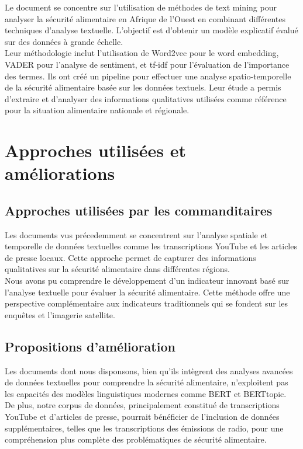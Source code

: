 \documentclass{article}
\begin{document}
Le document se concentre sur l'utilisation de méthodes de text mining pour analyser la sécurité alimentaire en Afrique de l'Ouest en combinant différentes techniques d'analyse textuelle. L'objectif est d'obtenir un modèle explicatif évalué sur des données à grande échelle. \\

Leur méthodologie inclut l'utilisation de Word2vec pour le word embedding, VADER pour l'analyse de sentiment, et tf-idf pour l'évaluation de l'importance des termes. Ils ont créé un pipeline pour effectuer une analyse spatio-temporelle de la sécurité alimentaire basée sur les données textuels. Leur étude a permis d'extraire et d'analyser des informations qualitatives utilisées comme référence pour la situation alimentaire nationale et régionale.

\section{Approches utilisées et améliorations}
\subsection{Approches utilisées par les commanditaires}
Les documents vus précedemment se concentrent sur l'analyse spatiale et temporelle de données textuelles comme les transcriptions YouTube et les articles de presse locaux. Cette approche permet de capturer des informations qualitatives sur la sécurité alimentaire dans différentes régions. \\

Nous avons pu comprendre le développement d'un indicateur innovant basé sur l'analyse textuelle pour évaluer la sécurité alimentaire. Cette méthode offre une perspective complémentaire aux indicateurs traditionnels qui se fondent sur les enquêtes et l'imagerie satellite.

\subsection{Propositions d'amélioration}
Les documents dont nous disponsons, bien qu'ils intègrent des analyses avancées de données textuelles pour comprendre la sécurité alimentaire, n'exploitent pas les capacités des modèles linguistiques modernes comme BERT et BERTtopic. \\

De plus, notre corpus de données, principalement constitué de transcriptions YouTube et d'articles de presse, pourrait bénéficier de l'inclusion de données supplémentaires, telles que les transcriptions des émissions de radio, pour une compréhension plus complète des problématiques de sécurité alimentaire.
\end{document}
